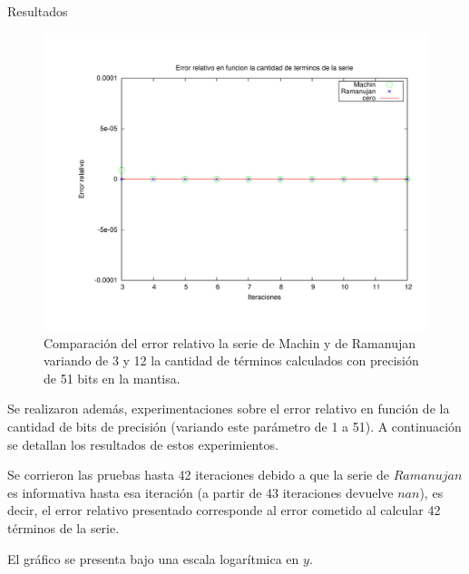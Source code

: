 \begin{section}{Resultados}
	\begin{figure}[H]
	  \centering
		\includegraphics[width=14cm]{graficos/comparacion_machin-ram.pdf}
	  \caption{Comparación del error relativo la serie de Machin y de Ramanujan variando de 3 y 12 la cantidad de términos calculados con precisión de 51 bits en la mantisa.}
	  \label{fig:greg-ram}
	\end{figure}
	
	Se realizaron además, experimentaciones sobre el error relativo en función de la cantidad de bits de precisión (variando este parámetro de 1 a 51). A continuación se detallan los resultados de estos experimientos.
	
	Se corrieron las pruebas hasta 42 iteraciones debido a que la serie de $Ramanujan$ es informativa hasta esa iteración (a partir de 43 iteraciones devuelve $nan$), es decir, el error relativo presentado corresponde al error cometido al calcular 42 términos de la serie.
	
	El gráfico se presenta bajo una escala logarítmica en $y$.
	

\end{section}
